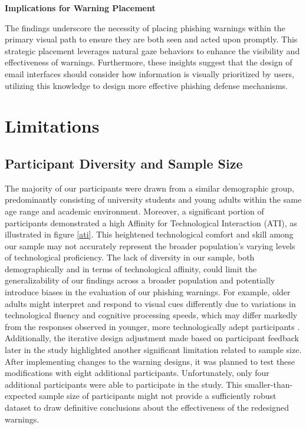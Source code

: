 \documentclass[
  a4paper,  %
  twoside,  %
  bibliography=totoc,
  headsepline,
  cleardoublepage=empty,
  parskip=half,
  draft=false
]{scrbook}
\begin{document}
\textbf{Implications for Warning Placement} 

The findings underscore the necessity of placing phishing warnings within the primary visual path to ensure they are both seen and acted upon promptly. This strategic placement leverages natural gaze behaviors to enhance the visibility and effectiveness of warnings. Furthermore, these insights suggest that the design of email interfaces should consider how information is visually prioritized by users, utilizing this knowledge to design more effective phishing defense mechanisms.

\section{Limitations}

\subsection{Participant Diversity and Sample Size}
The majority of our participants were drawn from a similar demographic group, predominantly consisting of university students and young adults within the same age range and academic environment. Moreover, a significant portion of participants demonstrated a high Affinity for Technological Interaction (ATI), as illustrated in figure \ref{ati}. This heightened technological comfort and skill among our sample may not accurately represent the broader population's varying levels of technological proficiency. The lack of diversity in our sample, both demographically and in terms of technological affinity, could limit the generalizability of our findings across a broader population and potentially introduce biases in the evaluation of our phishing warnings. For example, older adults might interpret and respond to visual cues differently due to variations in technological fluency and cognitive processing speeds, which may differ markedly from the responses observed in younger, more technologically adept participants \cite{age}. \newline
Additionally, the iterative design adjustment made based on participant feedback later in the study highlighted another significant limitation related to sample size. After implementing changes to the warning designs, it was planned to test these modifications with eight additional participants. Unfortunately, only four additional participants were able to participate in the study. This smaller-than-expected sample size of participants might not provide a sufficiently robust dataset to draw definitive conclusions about the effectiveness of the redesigned warnings.
\end{document}
